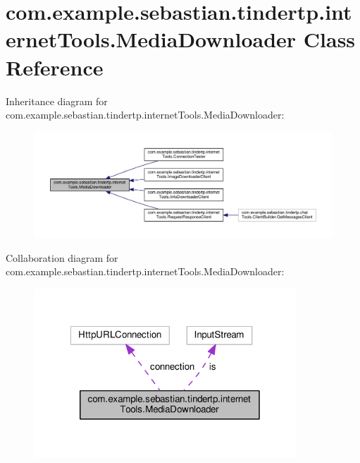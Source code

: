 \hypertarget{classcom_1_1example_1_1sebastian_1_1tindertp_1_1internetTools_1_1MediaDownloader}{}\section{com.\+example.\+sebastian.\+tindertp.\+internet\+Tools.\+Media\+Downloader Class Reference}
\label{classcom_1_1example_1_1sebastian_1_1tindertp_1_1internetTools_1_1MediaDownloader}


Inheritance diagram for com.\+example.\+sebastian.\+tindertp.\+internet\+Tools.\+Media\+Downloader\+:
\nopagebreak
\begin{figure}[H]
\begin{center}
\leavevmode
\includegraphics[width=350pt]{classcom_1_1example_1_1sebastian_1_1tindertp_1_1internetTools_1_1MediaDownloader__inherit__graph}
\end{center}
\end{figure}


Collaboration diagram for com.\+example.\+sebastian.\+tindertp.\+internet\+Tools.\+Media\+Downloader\+:
\nopagebreak
\begin{figure}[H]
\begin{center}
\leavevmode
\includegraphics[width=280pt]{classcom_1_1example_1_1sebastian_1_1tindertp_1_1internetTools_1_1MediaDownloader__coll__graph}
\end{center}
\end{figure}
